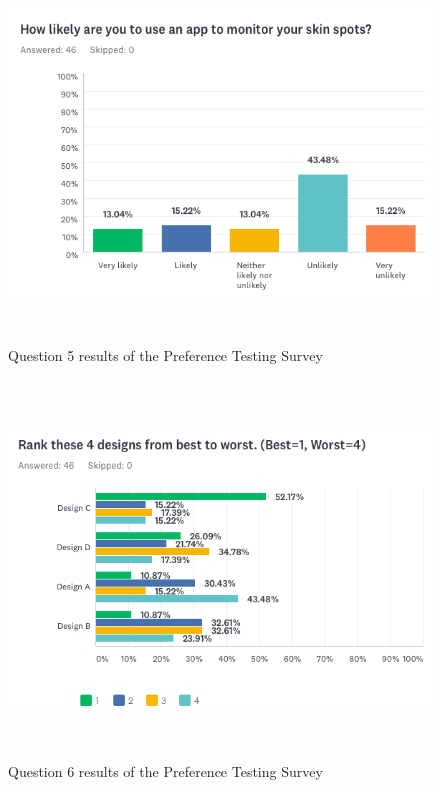 \begin{figure}[H]
    \includegraphics[height=10cm, center]{figures/surveyresult5}
    \caption{Question 5 results of the Preference Testing Survey}
    \label{fig:surveyresult5}
\end{figure}
\begin{figure}[H]
    \includegraphics[height=10cm, center]{figures/surveyresult6}
    \caption{Question 6 results of the Preference Testing Survey}
    \label{fig:surveyresult6}
\end{figure}
